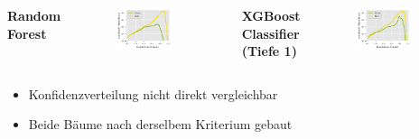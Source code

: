 \documentclass[aspectratio=1610, professionalfonts, 9pt]{beamer}
\begin{document}
\begin{frame}
  \begin{columns}[onlytextwidth]
	\Large \bf Random Forest
	\begin{figure}
	  \centering
	  \includegraphics[width=0.8\textwidth]{./Plots/sig_mess_tree.pdf}
	\end{figure}
	\Large \bf XGBoost Classifier (Tiefe 1)
	\begin{figure}
	  \centering
	  \includegraphics[width=0.8\textwidth]{./Plots/sig_mess_xgbc.pdf}
	\end{figure}
  \end{columns}
  \begin{itemize}
	\item Konfidenzverteilung nicht direkt vergleichbar
	\item Beide Bäume nach derselbem Kriterium gebaut
  \end{itemize}
\end{frame}
\end{document}
